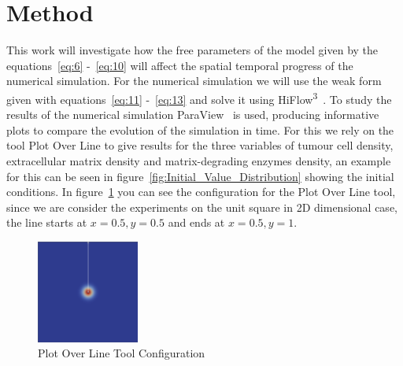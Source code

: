 

\section{Method}\label{sec:method}

This work will investigate how the free parameters of the model given by the equations~\ref{eq:6} -~\ref{eq:10} will affect the spatial temporal progress of the numerical simulation. For the numerical simulation we will use the weak form given with equations~\ref{eq:11} -~\ref{eq:13} and solve it using HiFlow\textsuperscript{3}~\cite{hiflow3}. To study the results of the numerical simulation ParaView~\cite{paraview} is used, producing informative plots to compare the evolution of the simulation in time. For this we rely on the tool Plot Over Line to give results for the three variables of tumour cell density, extracellular matrix density and matrix-degrading enzymes density, an example for this can be seen in figure~\ref{fig:Initial_Value_Distribution} showing the initial conditions. In figure~\ref{fig:PlotOverLine} you can see the configuration for the Plot Over Line tool, since we are consider the experiments on the unit square in 2D dimensional case, the line starts at $x=0.5, y=0.5$ and ends at $x=0.5, y=1$.\newline
\begin{figure}[h]
    \centering
    \includegraphics[width=0.3\textwidth]{resources/images/plot_over_line_tool.png}
    \caption{Plot Over Line Tool Configuration}
    \label{fig:PlotOverLine}
\end{figure}

